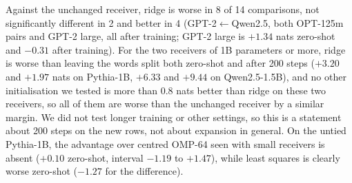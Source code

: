 \documentclass[preprint,12pt]{elsarticle}
\begin{document}
Against the unchanged receiver, ridge is worse in 8 of 14 comparisons, not significantly different in 2 and better in 4 (GPT-2$\leftarrow$Qwen2.5, both OPT-125m pairs and GPT-2 large, all after training; GPT-2 large is $+1.34$ nats zero-shot and $-0.31$ after training). For the two receivers of 1B parameters or more, ridge is worse than leaving the words split both zero-shot and after 200 steps ($+3.20$ and $+1.97$ nats on Pythia-1B, $+6.33$ and $+9.44$ on Qwen2.5-1.5B), and no other initialisation we tested is more than 0.8 nats better than ridge on these two receivers, so all of them are worse than the unchanged receiver by a similar margin. We did not test longer training or other settings, so this is a statement about 200 steps on the new rows, not about expansion in general. On the untied Pythia-1B, the advantage over centred OMP-64 seen with small receivers is absent ($+0.10$ zero-shot, interval $-1.19$ to $+1.47$), while least squares is clearly worse zero-shot ($-1.27$ for the difference).
\end{document}
